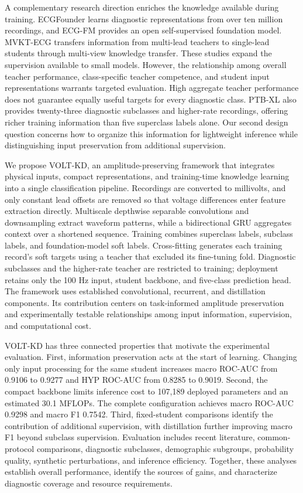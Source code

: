 \documentclass[11pt,a4paper]{article}
\begin{document}
A complementary research direction enriches the knowledge available during training. ECGFounder\cite{li2025} learns diagnostic representations from over ten million recordings, and ECG-FM\cite{mckeen2025} provides an open self-supervised foundation model. MVKT-ECG\cite{qin2023} transfers information from multi-lead teachers to single-lead students through multi-view knowledge transfer. These studies expand the supervision available to small models. However, the relationship among overall teacher performance, class-specific teacher competence, and student input representations warrants targeted evaluation. High aggregate teacher performance does not guarantee equally useful targets for every diagnostic class. PTB-XL also provides twenty-three diagnostic subclasses and higher-rate recordings, offering richer training information than five superclass labels alone. Our second design question concerns how to organize this information for lightweight inference while distinguishing input preservation from additional supervision.

We propose VOLT-KD, an amplitude-preserving framework that integrates physical inputs, compact representations, and training-time knowledge learning into a single classification pipeline. Recordings are converted to millivolts, and only constant lead offsets are removed so that voltage differences enter feature extraction directly. Multiscale depthwise separable convolutions and downsampling extract waveform patterns, while a bidirectional GRU aggregates context over a shortened sequence. Training combines superclass labels, subclass labels, and foundation-model soft labels. Cross-fitting generates each training record's soft targets using a teacher that excluded its fine-tuning fold. Diagnostic subclasses and the higher-rate teacher are restricted to training; deployment retains only the 100 Hz input, student backbone, and five-class prediction head. The framework uses established convolutional, recurrent, and distillation components. Its contribution centers on task-informed amplitude preservation and experimentally testable relationships among input information, supervision, and computational cost.

VOLT-KD has three connected properties that motivate the experimental evaluation. First, information preservation acts at the start of learning. Changing only input processing for the same student increases macro ROC-AUC from 0.9106 to 0.9277 and HYP ROC-AUC from 0.8285 to 0.9019. Second, the compact backbone limits inference cost to 107,189 deployed parameters and an estimated 30.1 MFLOPs. The complete configuration achieves macro ROC-AUC 0.9298 and macro F1 0.7542. Third, fixed-student comparisons identify the contribution of additional supervision, with distillation further improving macro F1 beyond subclass supervision. Evaluation includes recent literature, common-protocol comparisons, diagnostic subclasses, demographic subgroups, probability quality, synthetic perturbations, and inference efficiency. Together, these analyses establish overall performance, identify the sources of gains, and characterize diagnostic coverage and resource requirements.
\end{document}
